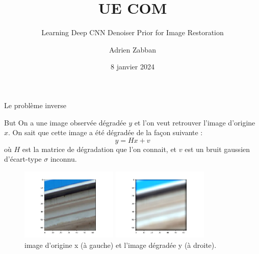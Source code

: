 \documentclass[11pt]{beamer}
\title{UE COM}
\subtitle{Learning Deep CNN Denoiser Prior for Image Restoration}
\author{Adrien Zabban}
\date{8 janvier 2024}
\begin{document}
\maketitle

\begin{frame}{Le problème inverse}
    \begin{block}{But}
        On a une image observée dégradée $y$ et l'on veut retrouver l'image d'origine $x$. On sait 
        que cette image a été dégradée de la façon suivante : 
        $$y = Hx + v$$
        où $H$ est la matrice de 
        dégradation que l'on connait, et $v$ est un bruit gaussien d'écart-type $\sigma$ inconnu.
    \end{block}
    \begin{figure}[b]
        \centering
        \includegraphics[width=0.41\textwidth]{../debluring/x.png}
        \hspace{1cm}
        \includegraphics[width=0.41\textwidth]{../debluring/y.png}
        \caption{image d'origine x (à gauche) et l'image dégradée y (à droite).}
    \end{figure}
\end{frame}
\end{document}
